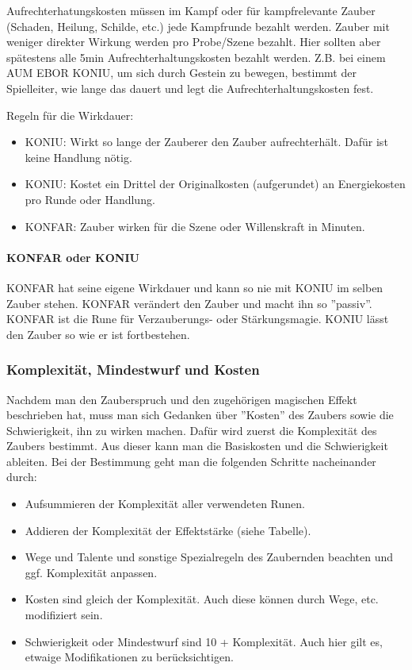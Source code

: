 \documentclass{article}
\begin{document}
Aufrechterhatungskosten müssen im Kampf oder für kampfrelevante Zauber (Schaden, Heilung, Schilde, etc.) jede Kampfrunde
bezahlt werden. Zauber mit weniger direkter Wirkung werden pro Probe/Szene bezahlt. Hier sollten aber spätestens alle
5min Aufrechterhaltungskosten bezahlt werden. Z.B. bei einem AUM EBOR KONIU, um sich durch Gestein zu bewegen, bestimmt
der Spielleiter, wie lange das dauert und legt die Aufrechterhaltungskosten fest.

Regeln für die Wirkdauer:

\begin{itemize}
\item KONIU: Wirkt so lange der Zauberer den Zauber aufrechterhält. Dafür ist keine Handlung nötig.
\item KONIU: Kostet ein Drittel der Originalkosten (aufgerundet) an Energiekosten pro Runde oder Handlung.
\item KONFAR: Zauber wirken für die Szene oder Willenskraft in Minuten.
\end{itemize}

\paragraph{KONFAR oder KONIU}

KONFAR hat seine eigene Wirkdauer und kann so nie mit KONIU im selben Zauber stehen. KONFAR verändert den Zauber und
macht ihn so ''passiv''. KONFAR ist die Rune für Verzauberungs- oder Stärkungsmagie. KONIU lässt den Zauber so wie er ist
fortbestehen.

\subsubsection{Komplexität, Mindestwurf und Kosten}

Nachdem man den Zauberspruch und den zugehörigen magischen Effekt beschrieben hat, muss man sich Gedanken über
''Kosten'' des Zaubers sowie die Schwierigkeit, ihn zu wirken machen. Dafür wird zuerst die Komplexität des Zaubers
bestimmt. Aus dieser kann man die Basiskosten und die Schwierigkeit ableiten. Bei der Bestimmung geht man die
folgenden Schritte nacheinander durch:

\begin{itemize}
\item Aufsummieren der Komplexität aller verwendeten Runen.
\item Addieren der Komplexität der Effektstärke (siehe Tabelle).
\item Wege und Talente und sonstige Spezialregeln des Zaubernden beachten und ggf. Komplexität anpassen.
\item Kosten sind gleich der Komplexität. Auch diese können durch Wege, etc. modifiziert sein.
\item Schwierigkeit oder Mindestwurf sind 10 + Komplexität. Auch hier gilt es, etwaige Modifikationen zu berücksichtigen.
\end{itemize}
\end{document}
